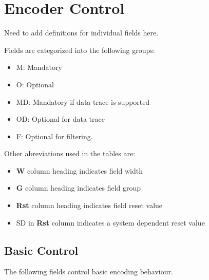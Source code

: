 \chapter{Encoder Control} \label{encoderControl}

Need to add definitions for individual fields here.

Fields are categorized into the following groups:

\begin{itemize}
  \item M: Mandatory
  \item O: Optional
  \item MD: Mandatory if data trace is supported
  \item OD: Optional for data trace
  \item F: Optional for filtering.
\end{itemize}

Other abreviations used in the tables are:
\begin{itemize}
  \item \textbf{W} column heading indicates field width
  \item \textbf{G} column heading indicates field group
  \item \textbf{Rst} column heading indicates field reset value
  \item SD in \textbf{Rst} column indicates a system dependent reset value
\end{itemize}

\section{Basic Control} \label{sec:ctl-basic}

The following fields control basic encoding behaviour.

